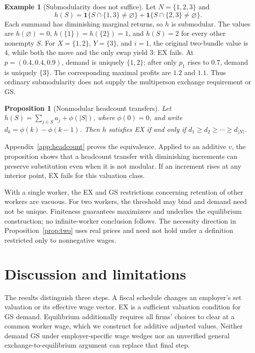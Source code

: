 \documentclass[11pt]{article}
\newtheorem{proposition}{Proposition}
\theoremstyle{definition}
\newtheorem{example}{Example}
\theoremstyle{remark}
\numberwithin{equation}{section}
\begin{document}
\begin{example}[Submodularity does not suffice]\label{ex:coverage}
Let $N=\{1,2,3\}$ and
\[
h(S)=\mathbf 1\{S\cap\{1,3\}\ne\varnothing\}
     +\mathbf 1\{S\cap\{2,3\}\ne\varnothing\}.
\]
Each summand has diminishing marginal returns, so $h$ is submodular. The values are $h(\varnothing)=0$, $h(\{1\})=h(\{2\})=1$, and $h(S)=2$ for every other nonempty $S$. For $X=\{1,2\}$, $Y=\{3\}$, and $i=1$, the original two-bundle value is $4$, while both the move and the only swap yield $3$: EX fails. At $p=(0.4,0.4,0.9)$, demand is uniquely $\{1,2\}$; after only $p_1$ rises to $0.7$, demand is uniquely $\{3\}$. The corresponding maximal profits are $1.2$ and $1.1$. Thus ordinary submodularity does not supply the multiperson exchange requirement or GS.
\end{example}

\begin{proposition}[Nonmodular headcount transfers]\label{prop:headcount}
Let $h(S)=\sum_{j\in S}a_j+\phi(|S|)$, where $\phi(0)=0$, and write $d_k=\phi(k)-\phi(k-1)$. Then $h$ satisfies EX if and only if $d_1\ge d_2\ge\cdots\ge d_{|N|}$.
\end{proposition}
\noindent Appendix~\ref{app:headcount} proves the equivalence. Applied to an additive $v$, the proposition shows that a headcount transfer with diminishing increments can preserve substitution even when it is not modular. If an increment rises at any interior point, EX fails for this valuation class.

With a single worker, the EX and GS restrictions concerning retention of other workers are vacuous. For two workers, the threshold may bind and demand need not be unique. Finiteness guarantees maximizers and underlies the equilibrium construction; no infinite-worker conclusion follows. The necessity direction in Proposition~\ref{prop:two} uses real prices and need not hold under a definition restricted only to nonnegative wages.

\section{Discussion and limitations}
The results distinguish three steps. A fiscal schedule changes an employer's set valuation or its effective wage vector. EX is a sufficient valuation condition for GS demand. Equilibrium additionally requires all firms' choices to clear at a common worker wage, which we construct for additive adjusted values. Neither demand GS under employer-specific wage wedges nor an unverified general exchange-to-equilibrium argument can replace that final step.
\end{document}
